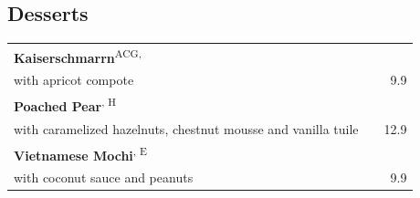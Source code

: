 \documentclass[a4paper,12pt]{article}
\newcommand{\vegan}{\textbf{\scriptsize \color{vegan}{Vegan}}}
\newcommand{\vegetarisch}{\textbf{\scriptsize \color{vegan}{Veg}}}
\begin{document}
\begin{multicols}{2}
\section*{Desserts}
\begin{tabular}{Lrr}
\textbf{Kaiserschmarrn}\textsuperscript{{\scriptsize ACG, \vegetarisch}}\\
\hspace{0.4cm}\scriptsize with apricot compote & & 9.9\\
\textbf{Poached Pear}\textsuperscript{{\scriptsize \vegan, H}}\\
\hspace{0.4cm}\scriptsize with caramelized hazelnuts, chestnut mousse and vanilla tuile & & 12.9\\
\textbf{Vietnamese Mochi}\textsuperscript{{\scriptsize \vegan, E}}\\
\hspace{0.4cm}\scriptsize with coconut sauce and peanuts & & 9.9
\end{tabular}


\end{multicols}
\end{document}
